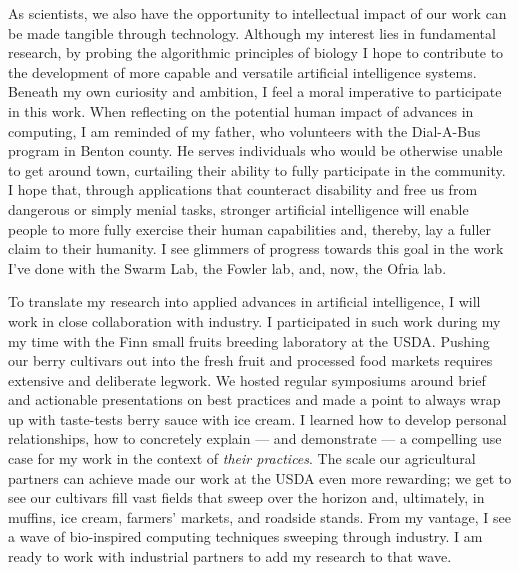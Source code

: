As scientists, we also have the opportunity to intellectual impact of our work can be made tangible through technology.
Although my interest lies in fundamental research, by probing the algorithmic principles of biology I hope to contribute to the development of more capable and versatile artificial intelligence systems.
Beneath my own curiosity and ambition, I feel a moral imperative to participate in this work.
When reflecting on the potential human impact of advances in computing, I am reminded of my father, who volunteers with the Dial-A-Bus program in Benton county.
He serves individuals who would be otherwise unable to get around town, curtailing their ability to fully participate in the community.
I hope that, through applications that counteract disability and free us from dangerous or simply menial tasks, stronger artificial intelligence will enable people to more fully exercise their human capabilities and, thereby, lay a fuller claim to their humanity.
I see glimmers of progress towards this goal in the work I've done with the Swarm Lab, the Fowler lab, and, now, the Ofria lab.

To translate my research into applied advances in artificial intelligence, I will work in close collaboration with industry.
I participated in such work during my my time with the Finn small fruits breeding laboratory at the USDA.
Pushing our berry cultivars out into the fresh fruit and processed food markets requires extensive and deliberate legwork.
We hosted regular symposiums around brief and actionable presentations on best practices and made a point to always wrap up with taste-tests berry sauce with ice cream.
I learned how to develop personal relationships, how to concretely explain --- and demonstrate --- a compelling use case for my work in the context of \textit{their practices}.
The scale our agricultural partners can achieve made our work at the USDA even more rewarding;
we get to see our cultivars fill vast fields that sweep over the horizon and, ultimately, in muffins, ice cream, farmers' markets, and roadside stands.
From my vantage, I see a wave of bio-inspired computing techniques sweeping through industry.
I am ready to work with industrial partners to add my research to that wave.
